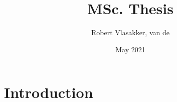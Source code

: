 \documentclass{article}
\title{MSc. Thesis}
\author{Robert Vlasakker, van de}
\date{May 2021}
\begin{document}
\maketitle

\section{Introduction}
\end{document}
